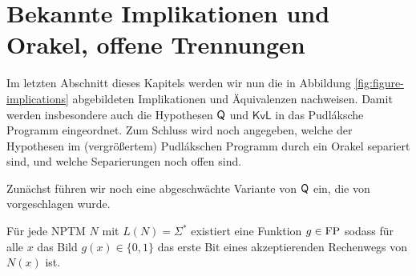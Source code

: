 

\section{Bekannte Implikationen und Orakel, offene Trennungen}

Im letzten Abschnitt dieses Kapitels werden wir nun die in Abbildung \ref{fig:figure-implications} abgebildeten Implikationen und Äquivalenzen nachweisen.
Damit werden insbesondere auch die Hypothesen $\mathsf{Q}$ und $\mathsf{KvL}$ in das Pudláksche Programm eingeordnet.
Zum Schluss wird noch angegeben, welche der Hypothesen im (vergrößertem) Pudlákschen Programm durch ein Orakel separiert sind, und welche Separierungen noch offen sind.

Zunächst führen wir noch eine abgeschwächte Variante von $\mathsf{Q}$ ein, die von \textcite{fenner_inverting_2003} vorgeschlagen wurde.

\begin{conjecture}
    Für jede NPTM $N$ mit $L(N)=\Sigma^*$ existiert eine Funktion $g\in\mathrm{FP}$ sodass für alle $x$ das Bild $g(x)\in\{0,1\}$ das erste Bit eines akzeptierenden Rechenwegs von $N(x)$ ist. 
\end{conjecture}

